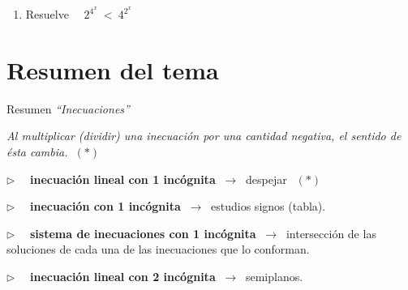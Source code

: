 \begin{enumerate}
\item	Resuelve $ \quad 2^{4^x}\ <\ 4^{2^x}$

\vspace{-10mm}
\begin{flushright}
\begin{scriptsize} \textcolor{gris}{\rotatebox{180}{ Escribe todo como potencias de base 2. $\quad \text{sol: } \ ]-\infty, 1[$ }}	\end{scriptsize}
\end{flushright}

\end{enumerate}



\vspace{1cm}
\section{Resumen del tema}
\vspace{0.5cm}

\begin{myblock}{Resumen  \emph{``Inecuaciones''}}

\vspace{2mm} \emph{Al multiplicar (dividir) una inecuación por una cantidad negativa, el sentido de ésta cambia. $\ (*)$}

\vspace{2mm} $\triangleright \quad $ \textbf{inecuación lineal con 1 incógnita} $\ \to \ $ despejar $\ \ (*)$

\vspace{2mm}  $\triangleright \quad $ \textbf{inecuación con 1 incógnita} $\ \to \ $ estudios signos (tabla).

\vspace{2mm}  $\triangleright \quad $ \textbf{sistema de inecuaciones con 1 incógnita} $\ \to \ $ intersección de las soluciones de cada una de las inecuaciones que lo conforman.

\vspace{2mm}  $\triangleright \quad $ \textbf{inecuación lineal con 2 incógnita} $\ \to \ $ semiplanos.

\vspace{2mm}	
\end{myblock}






